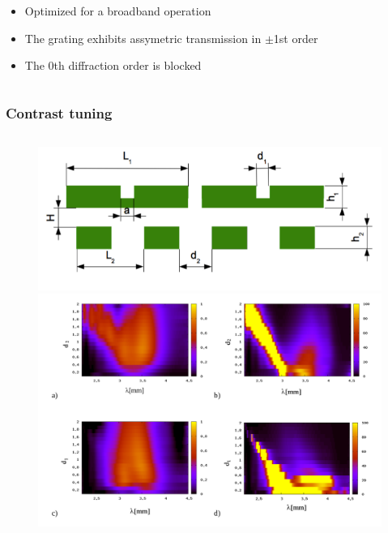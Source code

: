 \documentclass{beamer}
\begin{document}
\begin{frame}
\begin{columns}
\begin{column}{0.5\textwidth}
		\begin{itemize}
			\item Optimized for a broadband operation
			\item The grating exhibits assymetric transmission in  $\pm$1st order
			\item The 0th diffraction order is blocked
		\end{itemize}
		\end{column}

	\end{columns}
		
\end{frame}

\begin{frame}
	\frametitle{Contrast tuning}
	\begin{columns}
		\begin{column}{0.5\textwidth}
			\begin{figure}
				\includegraphics[width=\textwidth]{../images/dmg/kontrast_schemat.png}\\
				\includegraphics[width=\textwidth]{../images/dmg/kontrast_maps.png}\\

\end{figure}
\end{column}
\end{columns}
\end{frame}
\end{document}
